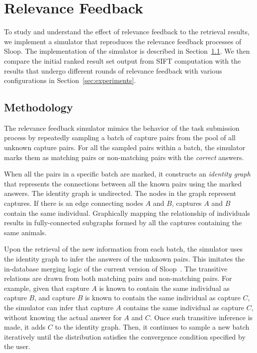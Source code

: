 \graphicspath{{images/chap4/}}
\chapter{Relevance Feedback} %
\label{cha:relevance_feedback}

To study and understand the effect of relevance feedback to the retrieval
results, we implement a simulator that reproduces the relevance feedback
processes of Sloop. The implementation of the simulator is described in
Section~\ref{sec:method}. We then compare the initial ranked result set output
from SIFT computation with the results that undergo different rounds of
relevance feedback with various configurations in Section~\ref{sec:experiments}.

\section{Methodology}
\label{sec:method}

The relevance feedback simulator mimics the behavior of the task submission
process by repeatedly sampling a batch of capture pairs from the pool of all
unknown capture pairs. For all the sampled pairs within a batch, the simulator
marks them as matching pairs or non-matching pairs with the \emph{correct}
answers.

When all the pairs in a specific batch are marked, it constructs an
\emph{identity graph} that represents the connections between all the known
pairs using the marked answers. The identity graph is undirected. The nodes in
the graph represent captures. If there is an edge connecting nodes $A$ and $B$,
captures $A$ and $B$ contain the same individual. Graphically mapping the
relationship of individuals results in fully-connected subgraphs formed by all
the captures containing the same animals.

Upon the retrieval of the new information from each batch, the simulator uses
the identity graph to infer the answers of the unknown pairs. This imitates the
in-database merging logic of the current version of Sloop~\cite{sloopdocs}. The
transitive relations are drawn from both matching pairs and non-matching pairs.
For example, given that capture $A$ is known to contain the same individual as
capture $B$, and capture $B$ is known to contain the same individual as capture
$C$, the simulator can infer that capture $A$ contains the same individual as
capture $C$, without knowing the actual answer for $A$ and $C$. Once such
transitive inference is made, it adds $C$ to the identity graph. Then, it
continues to sample a new batch iteratively until the distribution satisfies the
convergence condition specified by the user.

